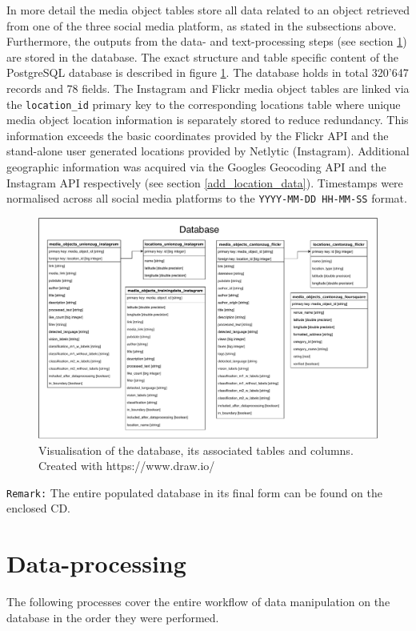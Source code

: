 In more detail the media object tables store all data related to an object retrieved from one of the three social media platform, as stated in the subsections above. Furthermore, the outputs from the data- and text-processing steps (see section \ref{data_processing}) are stored in the database. The exact structure and table specific content of the PostgreSQL database is described in figure \ref{fig:database}. The database holds in total 320'647 records and 78 fields. The Instagram and Flickr media object tables are linked via the \texttt{location\_id} primary key to the corresponding locations table where unique media object location information is separately stored to reduce redundancy. This information exceeds the basic coordinates provided by the Flickr API and the stand-alone user generated locations provided by Netlytic (Instagram). Additional geographic information was acquired via the Googles Geocoding API and the Instagram API respectively (see section \ref{add_location_data}). Timestamps were normalised across all social media platforms to the \texttt{YYYY-MM-DD HH-MM-SS} format.

\begin{figure}[h]
   \centering
   \includegraphics[width=\textwidth]{img/fusion_db_overview}
   \caption{Visualisation of the database, its associated tables and columns. \\ Created with https://www.draw.io/}
   \label{fig:database}
\end{figure}

\texttt{Remark:} The entire populated database in its final form can be found on the enclosed CD.

\section{Data-processing} \label{data_processing}
The following processes cover the entire workflow of data manipulation on the database in the order they were performed.
